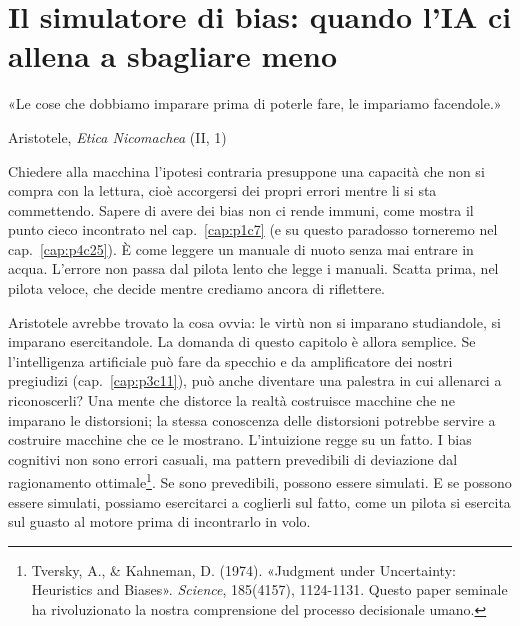 \chapter{Il simulatore di bias: quando l'IA ci allena a sbagliare meno}
\label{cap:p4c33}

\epigraph{«Le cose che dobbiamo imparare prima di poterle fare, le impariamo facendole.»}{Aristotele, \textit{Etica Nicomachea} (II, 1)}

Chiedere alla macchina l'ipotesi contraria presuppone una capacità che non si compra con la lettura, cioè accorgersi dei propri errori mentre li si sta commettendo. Sapere di avere dei bias non ci rende immuni, come mostra il punto cieco incontrato nel cap.~\ref{cap:p1c7} (e su questo paradosso torneremo nel cap.~\ref{cap:p4c25}). È come leggere un manuale di nuoto senza mai entrare in acqua. L'errore non passa dal pilota lento che legge i manuali. Scatta prima, nel pilota veloce, che decide mentre crediamo ancora di riflettere.

Aristotele avrebbe trovato la cosa ovvia: le virtù non si imparano studiandole, si imparano esercitandole. La domanda di questo capitolo è allora semplice. Se l'intelligenza artificiale può fare da specchio e da amplificatore dei nostri pregiudizi (cap.~\ref{cap:p3c11}), può anche diventare una palestra in cui allenarci a riconoscerli? Una mente che distorce la realtà costruisce macchine che ne imparano le distorsioni; la stessa conoscenza delle distorsioni potrebbe servire a costruire macchine che ce le mostrano. L'intuizione regge su un fatto. I bias cognitivi non sono errori casuali, ma pattern prevedibili di deviazione dal ragionamento ottimale\footnote{Tversky, A., \& Kahneman, D. (1974). «Judgment under Uncertainty: Heuristics and Biases». \textit{Science}, 185(4157), 1124-1131. Questo paper seminale ha rivoluzionato la nostra comprensione del processo decisionale umano.}. Se sono prevedibili, possono essere simulati. E se possono essere simulati, possiamo esercitarci a coglierli sul fatto, come un pilota si esercita sul guasto al motore prima di incontrarlo in volo.

